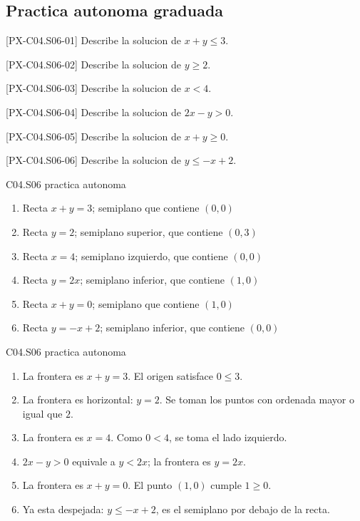 \subsection*{Practica autonoma graduada}
\begin{exercise}{[PX-C04.S06-01] Describe la solucion de \(x+y\leq 3\).}
\end{exercise}
\begin{exercise}{[PX-C04.S06-02] Describe la solucion de \(y\geq 2\).}
\end{exercise}
\begin{exercise}{[PX-C04.S06-03] Describe la solucion de \(x<4\).}
\end{exercise}
\begin{exercise}{[PX-C04.S06-04] Describe la solucion de \(2x-y>0\).}
\end{exercise}
\begin{exercise}{[PX-C04.S06-05] Describe la solucion de \(x+y\geq 0\).}
\end{exercise}
\begin{exercise}{[PX-C04.S06-06] Describe la solucion de \(y\leq -x+2\).}
\end{exercise}

\begin{shortanswer}{C04.S06 practica autonoma}
\begin{enumerate}[label=\textbf{PX-C04.S06-\arabic*:}, leftmargin=*]
  \item Recta \(x+y=3\); semiplano que contiene \((0,0)\)
  \item Recta \(y=2\); semiplano superior, que contiene \((0,3)\)
  \item Recta \(x=4\); semiplano izquierdo, que contiene \((0,0)\)
  \item Recta \(y=2x\); semiplano inferior, que contiene \((1,0)\)
  \item Recta \(x+y=0\); semiplano que contiene \((1,0)\)
  \item Recta \(y=-x+2\); semiplano inferior, que contiene \((0,0)\)
\end{enumerate}
\end{shortanswer}

\begin{fullsolution}{C04.S06 practica autonoma}
\begin{enumerate}[label=\textbf{PX-C04.S06-\arabic*:}, leftmargin=*]
  \item La frontera es \(x+y=3\). El origen satisface \(0\leq 3\).
  \item La frontera es horizontal: \(y=2\). Se toman los puntos con ordenada mayor o igual que \(2\).
  \item La frontera es \(x=4\). Como \(0<4\), se toma el lado izquierdo.
  \item \(2x-y>0\) equivale a \(y<2x\); la frontera es \(y=2x\).
  \item La frontera es \(x+y=0\). El punto \((1,0)\) cumple \(1\geq 0\).
  \item Ya esta despejada: \(y\leq -x+2\), es el semiplano por debajo de la recta.
\end{enumerate}
\end{fullsolution}

